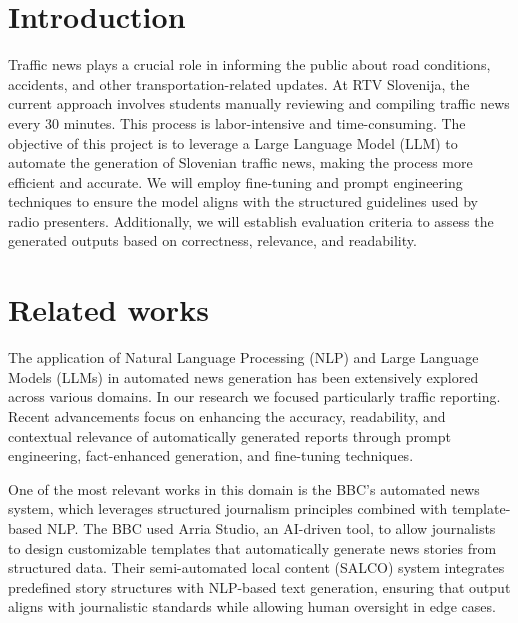 \documentclass[fleqn,moreauthors,10pt]{ds_report}
\affiliation{\textit{Advisors: Slavko Žitnik}}
\begin{document}
\flushbottom 

\maketitle 

\thispagestyle{empty} 


\section*{Introduction}
Traffic news plays a crucial role in informing the public about road conditions, accidents, and other transportation-related updates. At RTV Slovenija, the current approach involves students manually reviewing and compiling traffic news every 30 minutes. This process is labor-intensive and time-consuming.
The objective of this project is to leverage a Large Language Model (LLM) to automate the generation of Slovenian traffic news, making the process more efficient and accurate. We will employ fine-tuning and prompt engineering techniques to ensure the model aligns with the structured guidelines used by radio presenters. Additionally, we will establish evaluation criteria to assess the generated outputs based on correctness, relevance, and readability.




\section*{Related works}
The application of Natural Language Processing (NLP) and Large Language Models (LLMs) in automated news generation has been extensively explored across various domains. In our research we focused particularly traffic reporting. Recent advancements focus on enhancing the accuracy, readability, and contextual relevance of automatically generated reports through prompt engineering, fact-enhanced generation, and fine-tuning techniques. 

One of the most relevant works in this domain is the BBC’s automated news system, which leverages structured journalism principles combined with template-based NLP. The BBC used Arria Studio, an AI-driven tool, to allow journalists to design customizable templates that automatically generate news stories from structured data. Their semi-automated local content (SALCO) system integrates predefined story structures with NLP-based text generation, ensuring that output aligns with journalistic standards while allowing human oversight in edge cases. \cite{danzon2021automated}
\end{document}
